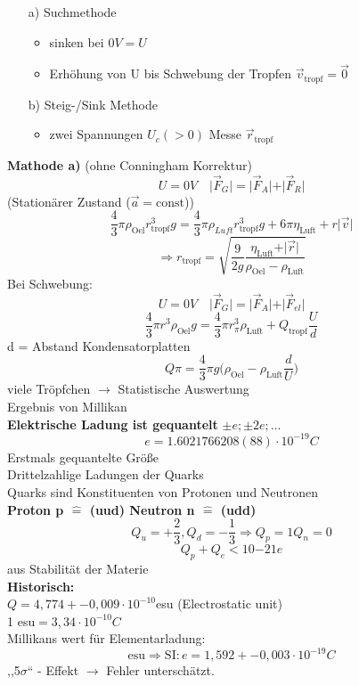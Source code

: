 \documentclass[titlepage,12pt,a4paper,ngerman]{report}
\newcommand{\tx}[1]{\textrm{#1}}
\begin{document}
\begin{itemize}
\item[a)] Suchmethode
\begin{itemize}
\item sinken bei $0V= U$
\item Erhöhung von U bis Schwebung der Tropfen $\vec{v}_{\textrm{tropf}} = \vec{0}$
\end{itemize}
\item[b)] Steig-/Sink Methode
\begin{itemize}
\item zwei Spannungen $U_c(>0)$ Messe $\vec{r}_{\tx{tropf}}$
\end{itemize}
\end{itemize}
\textbf{Mathode a)} (ohne Conningham Korrektur)\\
$$U = 0V \quad \vert \vec{F}_G \vert = \vert \vec{F}_A \vert + \vert \vec{F}_R \vert$$ (Stationärer Zustand ($\vec{a} = \tx{const}$))
$$\frac{4}{3} \pi \rho_{\tx{Oel}} r^3_{\tx{tropf}} g = \frac{4}{3} \pi \rho_{Luft} r_{\tx{tropf}}^3 g + 6 \pi \eta_{\tx{Luft}} + r \vert \vec{v} \vert$$
$$\Rightarrow r_{\tx{tropf}} = \sqrt{\frac{9}{2g} \frac{\eta_{\tx{Luft}} + \vert \vec{r} \vert }{\rho_{\tx{Oel}}-\rho_{\tx{Luft}}}}$$
Bei Schwebung:
$$U = 0V \quad \vert \vec{F}_G \vert = \vert \vec{F}_A \vert + \vert \vec{F}_{el} \vert$$
$$\frac{4}{3} \pi r^3 \rho_{\tx{Oel}} g = \frac{4}{3} \pi r^3_{\pi} \rho_{\tx{Luft}} + Q_{\tx{tropf}} \frac{U}{d}$$
 d = Abstand Kondensatorplatten
$$Q\pi = \frac{4}{3}	\pi g  \bigg( \rho_{\tx{Oel}}-\rho_{\tx{Luft}} \frac{d}{U}\bigg)$$
viele Tröpfchen $\rightarrow$ Statistische Auswertung\\
Ergebnis von Millikan \\
\textbf{Elektrische Ladung ist gequantelt} $\pm e;\pm2e;\dots$
$$e = 1.6021766208(88) \cdot 10^{-19} C$$
Erstmals gequantelte Größe\\
Drittelzahlige Ladungen der Quarks\\
Quarks sind Konstituenten von Protonen und Neutronen\\
\textbf{Proton p $\widehat{=}$ (uud) Neutron n $\widehat{=} $ (udd)}
$$Q_u = + \frac{2}{3}, Q_d = - \frac{1}{3} \Rightarrow Q_p = 1 Q_n = 0$$
$$Q_p + Q_e < 10{-21} e$$ aus Stabilität der Materie\\
\textbf{Historisch:}\\
$Q = 4,774 +- 0,009 \cdot 10^{-10}$esu (Electrostatic unit)\\
1 esu$ = 3,34 \cdot 10^{-10} C$\\
Millikans wert für Elementarladung: $$ \textrm{esu} \Rightarrow \textrm{SI}: e = 1,592 +- 0,003 \cdot 10 ^{-19} C$$
,,5$\sigma$`` - Effekt $\rightarrow$ Fehler unterschätzt.
\end{document}
